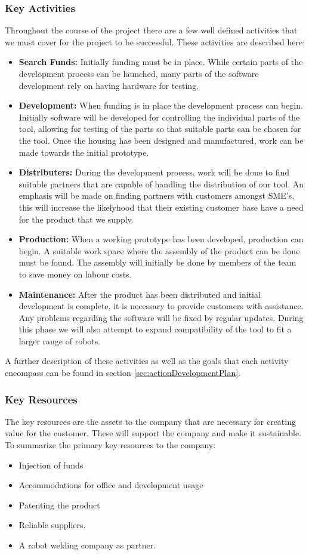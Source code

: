 \subsubsection{Key Activities}\label{key_activities}
Throughout the course of the project there are a few well defined activities that we must cover for the project to be successful. These activities are described here:

\begin{itemize}
	\item \textbf{Search Funds:} Initially funding must be in place. While certain parts of the development process can be launched, many parts of the software development rely on having hardware for testing. 
	\item \textbf{Development:}  When funding is in place the development process can begin. Initially software will be developed for controlling the individual parts of the tool, allowing for testing of the parts so that suitable parts can be chosen for the tool. Once the housing has been designed and manufactured, work can be made towards the initial prototype.
	\item \textbf{Distributers:} During the development process, work will be done to find suitable partners that are capable of handling the distribution of our tool. An emphasis will be made on finding partners with customers amongst SME's, this will increase the likelyhood that their existing customer base have a need for the product that we supply.
	\item \textbf{Production:}   When a working prototype has been developed, production can begin. A suitable work space where the assembly of the product can be done must be found. The assembly will initially be done by members of the team to save money on labour costs. 
	\item \textbf{Maintenance:}  After the product has been distributed and initial development is complete, it is necessary to provide customers with assistance. Any problems regarding the software will be fixed by regular updates. During this phase we will also attempt to expand compatibility of the tool to fit a larger range of robots.
\end{itemize} 

A further description of these activities as well as the goals that each activity encompass can be found in section \ref{sec:actionDevelopmentPlan}.
\subsubsection{Key Resources}
The key resources are the assets to the company that are necessary for creating value for the customer. These will support the company and make it sustainable.
To summarize the primary key resources to the company:
\begin{itemize}
\item Injection of funds
\item Accommodations for office and development usage
\item Patenting the product
\item Reliable suppliers. 
\item A robot welding company as partner.

\end{itemize}
